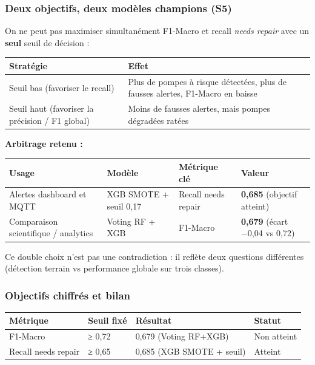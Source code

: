 \documentclass[11pt,a4paper]{report}
\begin{document}
\subsubsection{Deux objectifs, deux modèles champions (S5)}



On ne peut pas maximiser simultanément F1-Macro et recall \textit{needs repair} avec un \textbf{seul} seuil de décision :



\begin{longtable}{@{}ll@{}}
\toprule
Stratégie & Effet \\
\midrule
Seuil bas (favoriser le recall) & Plus de pompes à risque détectées, plus de fausses alertes, F1-Macro en baisse \\
Seuil haut (favoriser la précision / F1 global) & Moins de fausses alertes, mais pompes dégradées ratées \\
\bottomrule
\end{longtable}




\textbf{Arbitrage retenu :}



\begin{longtable}{@{}llll@{}}
\toprule
Usage & Modèle & Métrique clé & Valeur \\
\midrule
Alertes dashboard et MQTT & XGB SMOTE + seuil 0,17 & Recall needs repair & \textbf{0,685} (objectif atteint) \\
Comparaison scientifique / analytics & Voting RF + XGB & F1-Macro & \textbf{0,679} (écart −0,04 vs 0,72) \\
\bottomrule
\end{longtable}




Ce double choix n'est pas une contradiction : il reflète deux questions différentes (détection terrain vs performance globale sur trois classes).



\subsubsection{Objectifs chiffrés et bilan}



\begin{longtable}{@{}llll@{}}
\toprule
Métrique & Seuil fixé & Résultat & Statut \\
\midrule
F1-Macro & ≥ 0,72 & 0,679 (Voting RF+XGB) & Non atteint \\
Recall needs repair & ≥ 0,65 & 0,685 (XGB SMOTE + seuil) & Atteint \\
\bottomrule
\end{longtable}
\end{document}
